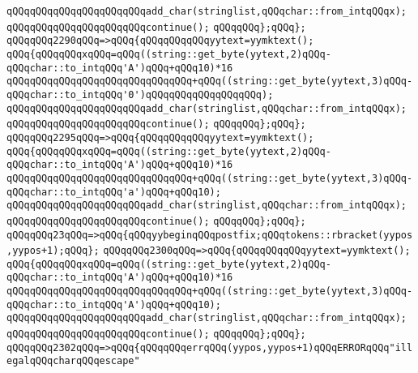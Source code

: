 \verb|qQQqqQQqqQQqqQQqqQQqqQQqadd_char(stringlist,qQQqchar::from_intqQQqx);|\newline
\verb|qQQqqQQqqQQqqQQqqQQqqQQqcontinue();|\newline
\verb|qQQqqQQq};qQQq};|\newline
\verb|qQQqqQQq2290qQQq=>qQQq{qQQqqQQqqQQqyytext=yymktext();|\newline
\verb|qQQq{qQQqqQQqxqQQq=qQQq((string::get_byte(yytext,2)qQQq-qQQqchar::to_intqQQq'A')qQQq+qQQq10)*16|\newline
\verb|qQQqqQQqqQQqqQQqqQQqqQQqqQQqqQQq+qQQq((string::get_byte(yytext,3)qQQq-qQQqchar::to_intqQQq'0')qQQqqQQqqQQqqQQqqQQq);|\newline
\verb|qQQqqQQqqQQqqQQqqQQqqQQqadd_char(stringlist,qQQqchar::from_intqQQqx);|\newline
\verb|qQQqqQQqqQQqqQQqqQQqqQQqcontinue();|\newline
\verb|qQQqqQQq};qQQq};|\newline
\verb|qQQqqQQq2295qQQq=>qQQq{qQQqqQQqqQQqyytext=yymktext();|\newline
\verb|qQQq{qQQqqQQqxqQQq=qQQq((string::get_byte(yytext,2)qQQq-qQQqchar::to_intqQQq'A')qQQq+qQQq10)*16|\newline
\verb|qQQqqQQqqQQqqQQqqQQqqQQqqQQqqQQq+qQQq((string::get_byte(yytext,3)qQQq-qQQqchar::to_intqQQq'a')qQQq+qQQq10);|\newline
\verb|qQQqqQQqqQQqqQQqqQQqqQQqadd_char(stringlist,qQQqchar::from_intqQQqx);|\newline
\verb|qQQqqQQqqQQqqQQqqQQqqQQqcontinue();|\newline
\verb|qQQqqQQq};qQQq};|\newline
\verb|qQQqqQQq23qQQq=>qQQq{qQQqyybeginqQQqpostfix;qQQqtokens::rbracket(yypos,yypos+1);qQQq};|\newline
\verb|qQQqqQQq2300qQQq=>qQQq{qQQqqQQqqQQqyytext=yymktext();|\newline
\verb|qQQq{qQQqqQQqxqQQq=qQQq((string::get_byte(yytext,2)qQQq-qQQqchar::to_intqQQq'A')qQQq+qQQq10)*16|\newline
\verb|qQQqqQQqqQQqqQQqqQQqqQQqqQQqqQQq+qQQq((string::get_byte(yytext,3)qQQq-qQQqchar::to_intqQQq'A')qQQq+qQQq10);|\newline
\verb|qQQqqQQqqQQqqQQqqQQqqQQqadd_char(stringlist,qQQqchar::from_intqQQqx);|\newline
\verb|qQQqqQQqqQQqqQQqqQQqqQQqcontinue();|\newline
\verb|qQQqqQQq};qQQq};|\newline
\verb|qQQqqQQq2302qQQq=>qQQq{qQQqqQQqerrqQQq(yypos,yypos+1)qQQqERRORqQQq"illegalqQQqcharqQQqescape"|\newline
